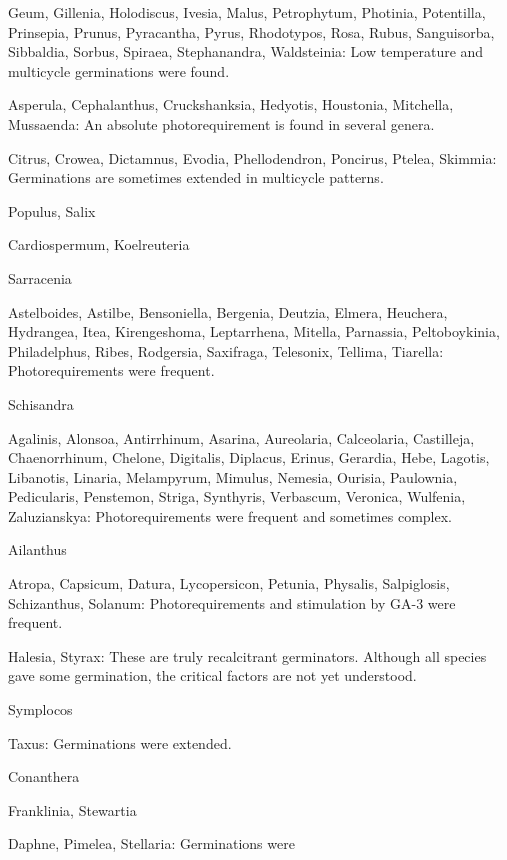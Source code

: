\begin{description}
Geum, Gillenia, Holodiscus, Ivesia, Malus, Petrophytum, Photinia, Potentilla,
Prinsepia, Prunus, Pyracantha, Pyrus, Rhodotypos, Rosa, Rubus, Sanguisorba,
Sibbaldia, Sorbus, Spiraea, Stephanandra, Waldsteinia: Low temperature and
multicycle germinations were found.
\item[Rubiaceae] Asperula, Cephalanthus, Cruckshanksia, Hedyotis, Houstonia,
Mitchella, Mussaenda: An absolute photorequirement is found in several genera.
\item[Rutaceae] Citrus, Crowea, Dictamnus, Evodia, Phellodendron, Poncirus,
Ptelea, Skimmia: Germinations are sometimes extended in multicycle patterns.
\item[Salicaceae] Populus, Salix
\item[Sapindaceae] Cardiospermum, Koelreuteria
\item[Sarraceniaceae] Sarracenia
\item[Saxifragaceae] Astelboides, Astilbe, Bensoniella, Bergenia, Deutzia,
Elmera, Heuchera, Hydrangea, Itea, Kirengeshoma, Leptarrhena, Mitella, Parnassia,
Peltoboykinia, Philadelphus, Ribes, Rodgersia, Saxifraga, Telesonix, Tellima, Tiarella:
Photorequirements were frequent.
\item[Schisandraceae] Schisandra
\item[Scrophulariaceae] Agalinis, Alonsoa, Antirrhinum, Asarina,
Aureolaria, Calceolaria, Castilleja, Chaenorrhinum, Chelone, Digitalis, Diplacus,
Erinus, Gerardia, Hebe, Lagotis, Libanotis, Linaria, Melampyrum, Mimulus, Nemesia,
Ourisia, Paulownia, Pedicularis, Penstemon, Striga, Synthyris, Verbascum, Veronica,
Wulfenia, Zaluzianskya: Photorequirements were frequent and sometimes complex.
\item[Simaroubaceae] Ailanthus
\item[Solanaceae] Atropa, Capsicum, Datura, Lycopersicon, Petunia, Physalis,
Salpiglosis, Schizanthus, Solanum: Photorequirements and stimulation by GA-3
were frequent.
\item[Styracaceae] Halesia, Styrax: These are truly recalcitrant germinators.
Although all species gave some germination, the critical factors are not yet
understood.
\item[Svmplocaceae] Symplocos
\item[Taxaceae] Taxus: Germinations were extended.
\item[Tecophiliaceae] Conanthera
\item[Theaceae] Franklinia, Stewartia
\item[Thymelaeaceae] Daphne, Pimelea, Stellaria: Germinations were

\end{description}
